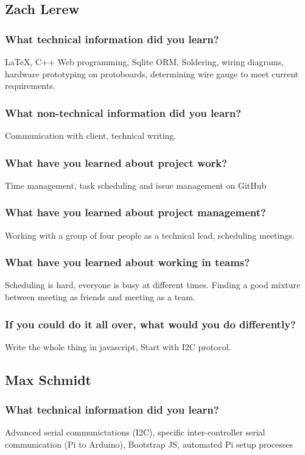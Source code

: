 \documentclass[onecolumn, draftclsnofoot,10pt, compsoc]{IEEEtran}
\begin{document}
		\subsection{Zach Lerew}
			\subsubsection{What technical information did you learn?}
			LaTeX, C++ Web programming, Sqlite ORM, Soldering, wiring diagrams, hardware prototyping on protoboards, determining wire gauge to meet current requirements.
 			\subsubsection{What non-technical information did you learn?}
			Communication with client, technical writing.
 			\subsubsection{What have you learned about project work?}
			Time management, task scheduling and issue management on GitHub
 			\subsubsection{What have you learned about project management?}
			Working with a group of four people as a technical lead, scheduling meetings.
 			\subsubsection{What have you learned about working in teams?}
			Scheduling is hard, everyone is busy at different times. Finding a good mixture between meeting as friends and meeting as a team.
 			\subsubsection{If you could do it all over, what would you do differently?}
			Write the whole thing in javascript, Start with I2C protocol.
		\subsection{Max Schmidt}
			\subsubsection{What technical information did you learn?} 
			Advanced serial communictations (I2C), specific inter-controller serial communication (Pi to Arduino), Bootstrap JS, automated Pi setup processes
\end{document}
